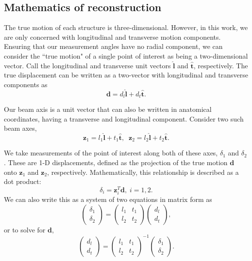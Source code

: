 \documentclass[preprint,NumberedRefs]{JASA}
\begin{document}
\subsection{Mathematics of reconstruction}
\par{The true motion of each structure is three-dimensional. However, in this work, we are only concerned with longitudinal and transverse motion components. Ensuring that our measurement angles have no radial component, we can consider the ``true motion" of a single point of interest as being a two-dimensional vector. Call the longitudinal and transverse unit vectors $\mathbf{\hat{l}}$ and $\mathbf{\hat{t}}$, respectively. The true displacement can be written as a two-vector with longitudinal and transverse components as 
\begin{equation}
    \mathbf{d} = d_l \mathbf{\hat{l}} + d_t \mathbf{\hat{t}}.
\end{equation}
}
\par{Our beam axis is a unit vector that can also be written in anatomical coordinates, having a transverse and longitudinal component. Consider two such beam axes,
\begin{equation}
    \mathbf{z}_1 = l_1 \mathbf{\hat{l}} + t_1 \mathbf{\hat{t}},\;\;\mathbf{z}_2 = l_2 \mathbf{\hat{l}} + t_2 \mathbf{\hat{t}}.
\end{equation}
}
\par{We take measurements of the point of interest along both of these axes, $\delta_1$ and $\delta_2$. These are 1-D displacements, defined as the projection of the true motion $\mathbf{d}$ onto $\mathbf{z}_1$ and $\mathbf{z}_2$, respectively. Mathematically, this relationship is described as a dot product: 
\begin{equation}
	\delta_i = \mathbf{z}_i^T\mathbf{d},\;i=1,2.
\end{equation}
We can also write this as a system of two equations in matrix form as
\renewcommand*{\arraystretch}{.5}
\begin{equation}
	\begin{pmatrix}\delta_1\\ \delta_2\end{pmatrix} = \begin{pmatrix}l_1&t_1\\l_2&t_2\end{pmatrix}\begin{pmatrix}d_l\\d_t\end{pmatrix},
\end{equation}
or to solve for $\mathbf{d}$,
\renewcommand*{\arraystretch}{.5}
\begin{equation}
	\begin{pmatrix}d_l\\d_t\end{pmatrix}= \begin{pmatrix}l_1&t_1\\l_2&t_2\end{pmatrix}^{-1}\begin{pmatrix}\delta_1\\ \delta_2\end{pmatrix}.
		\label{recon}
\end{equation}
}
\end{document}

